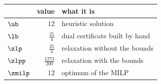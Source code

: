 \begin{center}\small
\begin{tabular}{lrl}
\toprule
 & value & what it is \\
\midrule
$\ub$ & $12$ & heuristic solution \\
$\lb$ & $\frac{25}{4}$ & dual certificate built by hand \\
$\zlp$ & $\frac{25}{4}$ & relaxation without the bounds \\
$\zlpp$ & $\frac{1273}{200}$ & relaxation with the bounds \\
$\zmilp$ & $12$ & optimum of the MILP \\
\bottomrule
\end{tabular}
\end{center}
